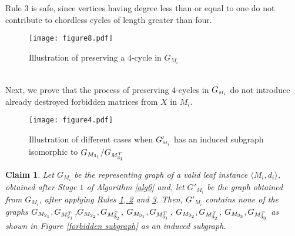 \documentclass[review, 1p]{elsarticle}
\newtheorem{claim}{Claim}
\begin{document}
\noindent Rule $3$ is safe, since vertices having degree less than or equal to one do not contribute to chordless cycles of length greater than four.
\begin{figure}[h] 
 \begin{center}
 \texttt{[image: figure8.pdf]} 
 \caption{Illustration of preserving a $4$-cycle in $G_{M_{i}}$}
 \label{fig8}
  \end{center}
   \end{figure}\\
Next, we prove that the process of preserving $4$-cycles in $G_{\mathsmaller M_{i}}$ do not introduce already destroyed forbidden matrices from $X$ in $M_{i}$.
\begin{figure}[t] 
 \begin{center}
 \texttt{[image: figure4.pdf]} 
 \caption{Illustration of different cases when $G'_{\mathsmaller M_{i}}$ has an induced subgraph isomorphic to $G_{ \tiny M_{3_{1}}}/G_{ \tiny M_{3_{1}}^{\tiny T}}$}
 \label{fig4}
  \end{center}
   \end{figure}
\begin{claim} \label{claim1}
Let $G_{M_{i}}$ be the representing graph of a valid leaf instance $ \langle M_{i},d_{i} \rangle$, obtained after Stage $1$ of Algorithm \ref{alg6} and, let $G'_{M_{i}}$ be the graph obtained from $G_{M_{i}}$, after applying Rules \hyperref[presv]{1, {2}} and \hyperref[presv]{3}. Then, $G'_{M_{i}}$ contains none of the graphs $G_{ \tiny M_{2_{1}}}, G_{ \tiny M_{2_{1}}^{\tiny T}}$,$G_{ \tiny M_{2_{2}}},G_{ \tiny M_{2_{2}}^{\tiny T}}$, $G_{ \tiny M_{3_{1}}},G_{ \tiny M_{3_{1}}^{\tiny T}}$, $G_{ \tiny M_{3_{2}}},G_{ \tiny M_{3_{2}}^{\tiny T}}$, $G_{ \tiny M_{3_{3}}},G_{ \tiny M_{3_{3}}^{\tiny T}}$ as shown in Figure \ref{forbidden subgraph} as an induced subgraph.
\end{claim}
\end{document}
